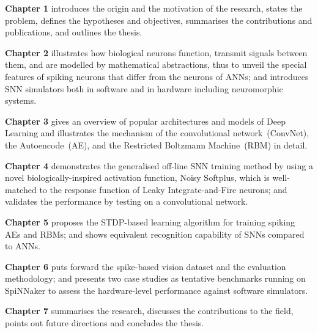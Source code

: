 \textbf{Chapter 1} introduces the origin and the motivation of the research, states the problem, defines the hypotheses and objectives, summarises the contributions and publications, and outlines the thesis. 

\textbf{Chapter 2} %
illustrates how biological neurons function, transmit signals between them, and are modelled by mathematical abstractions, thus to unveil the special features of spiking neurons that differ from the neurons of ANNs; and introduces SNN simulators both in software and in hardware including neuromorphic systems.

\textbf{Chapter 3} gives an overview of popular architectures and models of Deep Learning and illustrates the mechanism of the convolutional network~(ConvNet), the Autoencode~(AE), and the Restricted Boltzmann Machine~(RBM) in detail.

\textbf{Chapter 4} demonstrates the generalised off-line SNN training method by using a novel biologically-inspired activation function, Noisy Softplus, which is well-matched to the response function of Leaky Integrate-and-Fire neurons; and validates the performance by testing on a convolutional network.

\textbf{Chapter 5} proposes the STDP-based learning algorithm for training spiking AEs and RBMs; and shows equivalent recognition capability of SNNs compared to ANNs.

\textbf{Chapter 6} puts forward the spike-based vision dataset and the evaluation methodology; and presents two case studies as tentative benchmarks running on SpiNNaker to assess the hardware-level performance against software simulators.

\textbf{Chapter 7} summarises the research, discusses the contributions to the field, points out future directions and concludes the thesis.



